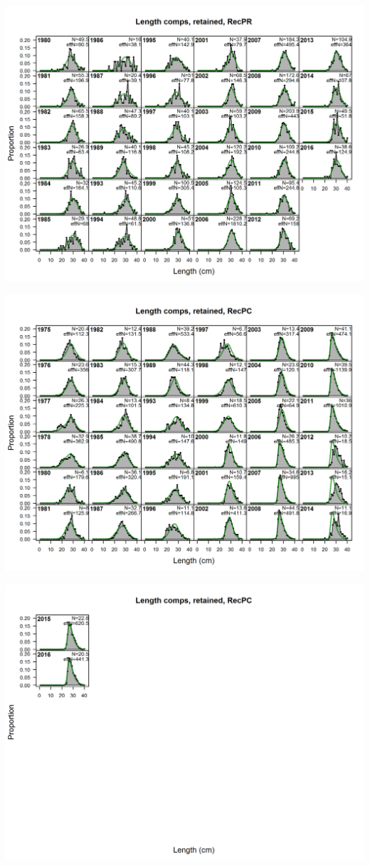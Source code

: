\documentclass[ignorenonframetext,compress]{beamer}
\begin{document}
\includegraphics{./r4ss/plots_mod1/comp_lenfit_flt4mkt2.png}

\includegraphics{./r4ss/plots_mod1/comp_lenfit_flt5mkt2_page1.png}

\includegraphics{./r4ss/plots_mod1/comp_lenfit_flt5mkt2_page2.png}
\end{document}
